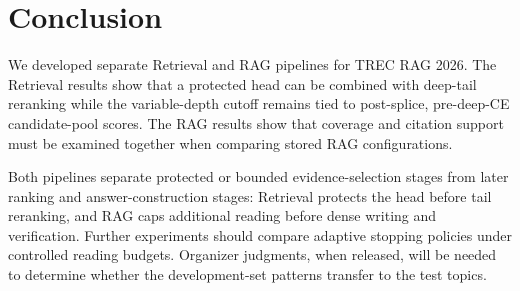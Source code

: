 \section{Conclusion}

We developed separate Retrieval and RAG pipelines for TREC RAG 2026.
The Retrieval results show that a protected head can be combined with
deep-tail reranking while the variable-depth cutoff remains tied to
post-splice, pre-deep-CE candidate-pool scores. The RAG results show that coverage and citation
support must be examined together when comparing stored RAG
configurations.

Both pipelines separate protected or bounded evidence-selection stages
from later ranking and answer-construction stages: Retrieval protects the head before tail reranking, and RAG caps
additional reading before dense writing and verification. Further
experiments should compare adaptive stopping policies under controlled
reading budgets. Organizer judgments, when released, will be needed to
determine whether the development-set patterns transfer to the test
topics.
